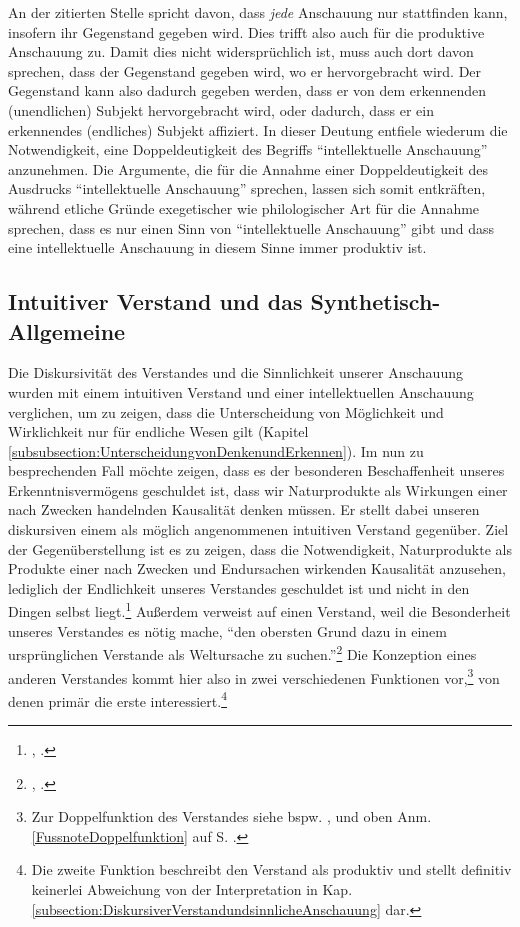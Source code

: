 An der zitierten Stelle spricht  davon,
dass \emph{jede} Anschauung nur stattfinden kann, insofern ihr Gegenstand
gegeben wird. Dies trifft also auch für die produktive Anschauung
zu. Damit dies nicht widersprüchlich ist, muss 
auch dort davon sprechen, dass der Gegenstand gegeben wird, wo er hervorgebracht
wird. Der Gegenstand kann also dadurch gegeben werden, dass er von dem
erkennenden (unendlichen) Subjekt hervorgebracht wird, oder dadurch, dass er ein
erkennendes (endliches) Subjekt affiziert. In dieser Deutung entfiele wiederum
die Notwendigkeit, eine Doppeldeutigkeit des Begriffs \enquote{intellektuelle
Anschauung} anzunehmen. Die Argumente, die für die Annahme einer
Doppeldeutigkeit des Ausdrucks \enquote{intellektuelle Anschauung} sprechen,
lassen sich somit entkräften, während etliche Gründe exegetischer wie
philologischer Art für die Annahme sprechen, dass es nur einen Sinn von
\enquote{intellektuelle Anschauung} gibt und dass eine intellektuelle Anschauung
in diesem Sinne immer produktiv ist.

\subsection{Intuitiver Verstand und das
Synthetisch-Allgemeine}\label{subsection:IntuitiverVerstandunddasSynthetischAllgemeine}
Die Diskursivität des Verstandes und die Sinnlichkeit unserer Anschauung wurden
mit einem intuitiven Verstand und einer intellektuellen Anschauung verglichen, um zu
zeigen, dass die Unterscheidung von Möglichkeit und Wirklichkeit nur für
endliche Wesen gilt (Kapitel
\ref{subsubsection:UnterscheidungvonDenkenundErkennen}). Im nun zu besprechenden
Fall möchte  zeigen, dass es der besonderen Beschaffenheit
unseres Erkenntnisvermögens geschuldet ist, dass wir Naturprodukte als Wirkungen
einer nach Zwecken handelnden Kausalität denken müssen. Er stellt dabei unseren diskursiven
einem als möglich angenommenen intuitiven Verstand gegenüber. Ziel der
Gegenüberstellung ist es zu zeigen, dass die Notwendigkeit, Naturprodukte als
Produkte einer nach Zwecken und Endursachen wirkenden Kausalität anzusehen,
lediglich der Endlichkeit unseres Verstandes geschuldet ist und nicht in den
Dingen selbst liegt.\footnote{\cite[][\S~77]{Kant:KritikderUrteilskraft2009},
\cite[][V: 408.2--13]{Kant:GesammelteWerke1900ff.}.} Außerdem verweist
 auf einen
 Verstand, weil die Besonderheit unseres Verstandes
es nötig mache, \enquote{den obersten Grund dazu in einem ursprünglichen Verstande als
Weltursache zu suchen.}\footnote{\cite[][\S~77]{Kant:KritikderUrteilskraft2009},
\cite[][V: 410.10--11]{Kant:GesammelteWerke1900ff.}.} Die Konzeption eines
anderen Verstandes kommt hier also in zwei verschiedenen Funktionen vor,\footnote{Zur Doppelfunktion des Verstandes siehe bspw.
\cite[][68]{Duesing:DieTeleologieinKantsWeltbegriff1968}, und oben
Anm. \ref{FussnoteDoppelfunktion} auf S. \pageref{FussnoteDoppelfunktion}.} von denen primär die
erste interessiert.\footnote{Die zweite Funktion beschreibt den
 Verstand als produktiv und stellt definitiv keinerlei
Abweichung von der Interpretation in Kap.
\ref{subsection:DiskursiverVerstandundsinnlicheAnschauung} dar.}

